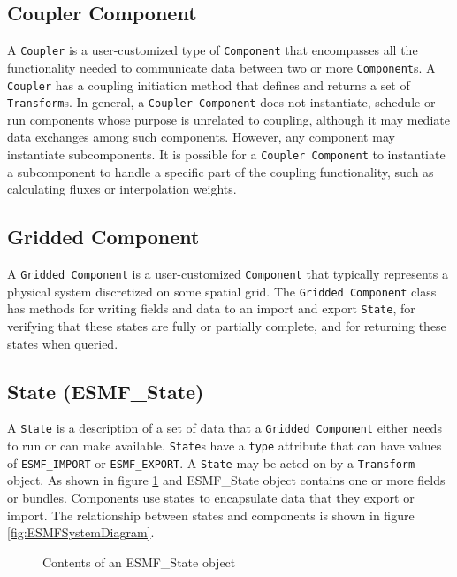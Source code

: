\subsection{Coupler Component }
A {\tt Coupler} is a user-customized type of {\tt Component} that 
encompasses all the functionality needed to communicate data between two or 
more {\tt Component}s.  A {\tt Coupler} has a coupling initiation method that 
defines and returns a set of {\tt Transform}s. In general, a {\tt Coupler Component} does not instantiate, schedule or run components whose purpose is unrelated 
to coupling, although it may mediate data exchanges among such components.
However, any component may instantiate subcomponents. It is possible
for a {\tt Coupler Component} to instantiate a subcomponent to handle a
specific part of the coupling functionality, such as calculating fluxes
or interpolation weights.


\subsection{Gridded Component }
\label{sec:griddedcomponent} 
A {\tt Gridded Component} is a user-customized {\tt Component} 
that typically represents a physical system discretized on some spatial grid.
The {\tt Gridded Component} class has methods for writing 
fields and data to an import and export {\tt State}, for verifying that
these states are fully or partially complete, and for returning these
states when queried.

\subsection{State (ESMF\_State)}
A {\tt State} is a description of a set of data that a 
{\tt Gridded Component} either needs to run or can make available.  
{\tt State}s
have a {\tt type} attribute that can have values of {\tt ESMF\_IMPORT} or
{\tt ESMF\_EXPORT}.  A {\tt State} may be acted on by a {\tt Transform} object.
As shown in figure \ref{fig:ESMFStateDiagram} and ESMF\_State object contains 
one or more fields or bundles. Components use states to encapsulate 
data that they export or import. The relationship between states and 
components is shown in figure \ref{fig:ESMFSystemDiagram}.

\begin{figure}
\caption[{ESMF State Contents}]{Contents of an ESMF\_State object}
\label{fig:ESMFStateDiagram}
\end{figure}


